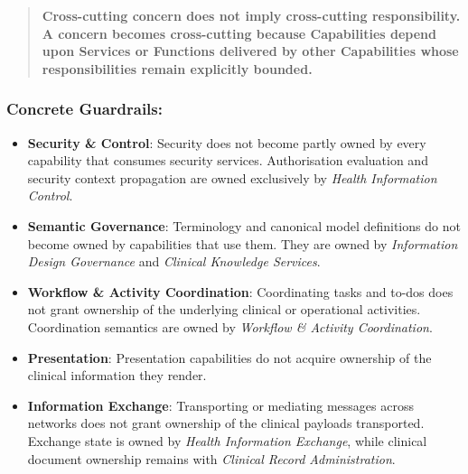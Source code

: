 \begin{quote}

\textbf{Cross-cutting concern does not imply cross-cutting responsibility. A concern becomes cross-cutting because Capabilities depend upon Services or Functions delivered by other Capabilities whose responsibilities remain explicitly bounded.}


\end{quote}
\label{rad:metamodel:248}
\subsubsection*{Concrete Guardrails:}
\label{rad:metamodel:249}

\begin{itemize}

\item
\textbf{Security \& Control}: Security does not become partly owned by every capability that consumes security services. Authorisation evaluation and security context propagation are owned exclusively by \emph{Health Information Control}.



\item
\textbf{Semantic Governance}: Terminology and canonical model definitions do not become owned by capabilities that use them. They are owned by \emph{Information Design Governance} and \emph{Clinical Knowledge Services}.



\item
\textbf{Workflow \& Activity Coordination}: Coordinating tasks and to-dos does not grant ownership of the underlying clinical or operational activities. Coordination semantics are owned by \emph{Workflow \& Activity Coordination}.



\item
\textbf{Presentation}: Presentation capabilities do not acquire ownership of the clinical information they render.



\item
\textbf{Information Exchange}: Transporting or mediating messages across networks does not grant ownership of the clinical payloads transported. Exchange state is owned by \emph{Health Information Exchange}, while clinical document ownership remains with \emph{Clinical Record Administration}.



\end{itemize}
\label{rad:metamodel:255}

